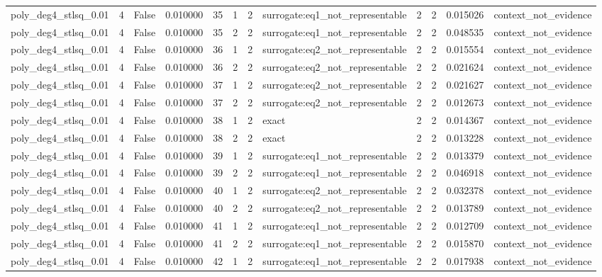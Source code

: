 \begin{tabular}{lrrrrrrlrrrl}
poly\_deg4\_stlsq\_0.01 & 4 & False & 0.010000 & 35 & 1 & 2 & surrogate:eq1\_not\_representable & 2 & 2 & 0.015026 & context\_not\_evidence \\
poly\_deg4\_stlsq\_0.01 & 4 & False & 0.010000 & 35 & 2 & 2 & surrogate:eq1\_not\_representable & 2 & 2 & 0.048535 & context\_not\_evidence \\
poly\_deg4\_stlsq\_0.01 & 4 & False & 0.010000 & 36 & 1 & 2 & surrogate:eq2\_not\_representable & 2 & 2 & 0.015554 & context\_not\_evidence \\
poly\_deg4\_stlsq\_0.01 & 4 & False & 0.010000 & 36 & 2 & 2 & surrogate:eq2\_not\_representable & 2 & 2 & 0.021624 & context\_not\_evidence \\
poly\_deg4\_stlsq\_0.01 & 4 & False & 0.010000 & 37 & 1 & 2 & surrogate:eq2\_not\_representable & 2 & 2 & 0.021627 & context\_not\_evidence \\
poly\_deg4\_stlsq\_0.01 & 4 & False & 0.010000 & 37 & 2 & 2 & surrogate:eq2\_not\_representable & 2 & 2 & 0.012673 & context\_not\_evidence \\
poly\_deg4\_stlsq\_0.01 & 4 & False & 0.010000 & 38 & 1 & 2 & exact & 2 & 2 & 0.014367 & context\_not\_evidence \\
poly\_deg4\_stlsq\_0.01 & 4 & False & 0.010000 & 38 & 2 & 2 & exact & 2 & 2 & 0.013228 & context\_not\_evidence \\
poly\_deg4\_stlsq\_0.01 & 4 & False & 0.010000 & 39 & 1 & 2 & surrogate:eq1\_not\_representable & 2 & 2 & 0.013379 & context\_not\_evidence \\
poly\_deg4\_stlsq\_0.01 & 4 & False & 0.010000 & 39 & 2 & 2 & surrogate:eq1\_not\_representable & 2 & 2 & 0.046918 & context\_not\_evidence \\
poly\_deg4\_stlsq\_0.01 & 4 & False & 0.010000 & 40 & 1 & 2 & surrogate:eq2\_not\_representable & 2 & 2 & 0.032378 & context\_not\_evidence \\
poly\_deg4\_stlsq\_0.01 & 4 & False & 0.010000 & 40 & 2 & 2 & surrogate:eq2\_not\_representable & 2 & 2 & 0.013789 & context\_not\_evidence \\
poly\_deg4\_stlsq\_0.01 & 4 & False & 0.010000 & 41 & 1 & 2 & surrogate:eq1\_not\_representable & 2 & 2 & 0.012709 & context\_not\_evidence \\
poly\_deg4\_stlsq\_0.01 & 4 & False & 0.010000 & 41 & 2 & 2 & surrogate:eq1\_not\_representable & 2 & 2 & 0.015870 & context\_not\_evidence \\
poly\_deg4\_stlsq\_0.01 & 4 & False & 0.010000 & 42 & 1 & 2 & surrogate:eq1\_not\_representable & 2 & 2 & 0.017938 & context\_not\_evidence \\

\end{tabular}
